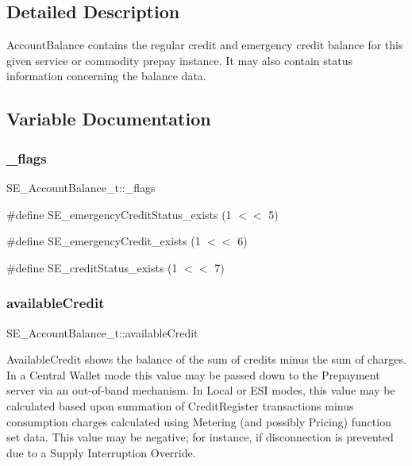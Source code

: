 \subsection{Detailed Description}
Account\+Balance contains the regular credit and emergency credit balance for this given service or commodity prepay instance. It may also contain status information concerning the balance data. 

\subsection{Variable Documentation}
\mbox{\label{group__AccountBalance_ga159898a9138df7e3c536ff9d29b8e812}} 
\subsubsection{\texorpdfstring{\+\_\+flags}{\_flags}}
{\footnotesize\ttfamily S\+E\+\_\+\+Account\+Balance\+\_\+t\+::\+\_\+flags}

\#define S\+E\+\_\+emergency\+Credit\+Status\+\_\+exists (1 $<$$<$ 5)

\#define S\+E\+\_\+emergency\+Credit\+\_\+exists (1 $<$$<$ 6)

\#define S\+E\+\_\+credit\+Status\+\_\+exists (1 $<$$<$ 7) \mbox{\label{group__AccountBalance_ga91ffb617dfc316f5a8e2332846c5834d}} 
\subsubsection{\texorpdfstring{available\+Credit}{availableCredit}}
{\footnotesize\ttfamily S\+E\+\_\+\+Account\+Balance\+\_\+t\+::available\+Credit}

Available\+Credit shows the balance of the sum of credits minus the sum of charges. In a Central Wallet mode this value may be passed down to the Prepayment server via an out-\/of-\/band mechanism. In Local or E\+SI modes, this value may be calculated based upon summation of Credit\+Register transactions minus consumption charges calculated using Metering (and possibly Pricing) function set data. This value may be negative; for instance, if disconnection is prevented due to a Supply Interruption Override. \mbox{\label{group__AccountBalance_ga77494ec1a8a44d085d63afc1e0f936eb}} 

